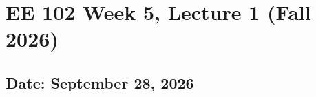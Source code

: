 \documentclass{ee102_notes}
\renewcommand{\releasedate}{September 28, 2026}
\begin{document}
\section*{EE 102 Week 5, Lecture 1 (Fall 2026)}
\subsection*{Date: \releasedate}
\tableofcontents

\end{document}
